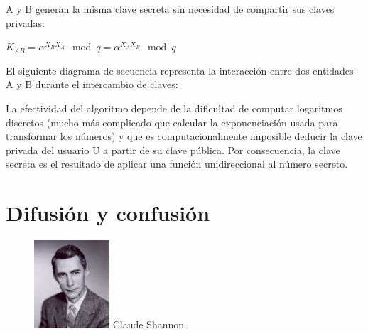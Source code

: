 \documentclass[11pt]{article}
\begin{document}
A y B generan la misma clave secreta sin necesidad de compartir sus claves privadas:

\begin{center}
$K_{AB} = \alpha^{X_B X_A} \mod q = \alpha^{X_A X_B} \mod q$
\end{center}

El siguiente diagrama de secuencia representa la interacción entre dos entidades A y B durante el intercambio de claves:
\begin{center}\end{center}

La efectividad del algoritmo depende de la dificultad de computar logaritmos discretos (mucho más complicado que calcular la exponenciación usada para transformar los números) y que es computacionalmente imposible deducir la clave privada del usuario U a partir de su clave pública. Por consecuencia, la clave secreta es el resultado de aplicar una función unidireccional al número secreto.

\newpage


\section{Difusión y confusión}

\begin{figure} %
    \centering
    \includegraphics[width=0.25\textwidth]{img/Shannon.jpg}
    Claude Shannon
\end{figure}
\end{document}
